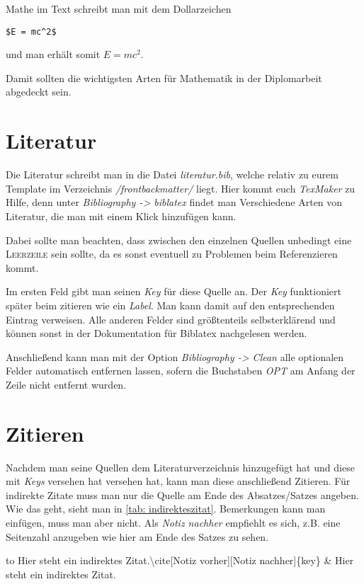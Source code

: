 Mathe im Text schreibt man mit dem Dollarzeichen
\begin{lstlisting}
$E = mc^2$
\end{lstlisting}
und man erhält somit $E=mc^2$.

Damit sollten die wichtigsten Arten für Mathematik in der Diplomarbeit abgedeckt sein.
%
%
\section{Literatur}%
Die Literatur schreibt man in die Datei \emph{literatur.bib}, welche relativ zu eurem Template im Verzeichnis \emph{/frontbackmatter/} liegt. Hier kommt euch \emph{TexMaker} zu Hilfe, denn unter \emph{Bibliography -> biblatex} findet man Verschiedene Arten von Literatur, die man mit einem Klick hinzufügen kann.%

Dabei sollte man beachten, dass zwischen den einzelnen Quellen unbedingt eine \textsc{Leerzeile} sein sollte, da es sonst eventuell zu Problemen beim Referenzieren kommt.%

Im ersten Feld gibt man seinen \emph{Key} für diese Quelle an. Der \emph{Key} funktioniert später beim zitieren wie ein \emph{Label}. Man kann damit auf den entsprechenden Eintrag verweisen. Alle anderen Felder sind größtenteils selbsterklärend und können sonst in der Dokumentation für Biblatex nachgelesen werden.%

Anschließend kann man mit der Option \emph{Bibliography -> Clean} alle optionalen Felder automatisch entfernen lassen, sofern die Buchstaben \emph{OPT} am Anfang der Zeile nicht entfernt wurden.%
%
%
\section{Zitieren}%
Nachdem man seine Quellen dem Literaturverzeichnis hinzugefügt hat und diese mit \emph{Keys} versehen hat versehen hat, kann man diese anschließend Zitieren.%
Für indirekte Zitate muss man nur die Quelle am Ende des Absatzes/Satzes angeben. Wie das geht, sieht man in \ref{tab: indirekteszitat}. Bemerkungen kann man einfügen, muss man aber nicht. Als \emph{Notiz nachher} empfiehlt es sich, z.B. eine Seitenzahl anzugeben wie hier am Ende des Satzes zu sehen. \cite[][S.22 ff]{einstein}
\begin{table}[h]%
\begin{tabu} to \textwidth {X[c]X[c]}%
\toprule%
Hier steht ein indirektes Zitat.\textbackslash cite[Notiz vorher][Notiz nachher]\{key\} & Hier steht ein indirektes Zitat.\cite[Notiz vorher][Notiz nachher]{einstein}\\%
\bottomrule%
\end{tabu}%
\caption{Indirektes Zitat}%
\label{tab: indirekteszitat}%
\end{table}%

